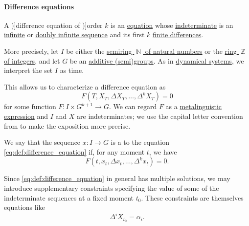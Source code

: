 \paragraph{Difference equations}

\begin{definition}\label{def:difference_equation}\mimprovised
  A \term[ru=разностное уравнение (\cite[307]{Гельфонд1959ИсчислениеКонечныхРазностей})]{difference equation} of \term[ru=порядок (разностного уравнения) (\cite[307]{Гельфонд1959ИсчислениеКонечныхРазностей})]{order} \( k \) is an \hyperref[def:equation]{equation} whose \hyperref[con:indeterminate]{indeterminate} is an \hyperref[def:sequence]{infinite} or \hyperref[def:doubly_infinite_sequence]{doubly infinite sequence} and its first \( k \) \hyperref[def:finite_difference_operator]{finite differences}.

  More precisely, let \( I \) be either the \hyperref[def:natural_numbers]{semiring \( \BbbN \) of natural numbers} or the \hyperref[def:integers]{ring \( \BbbZ \) of integers}, and let \( G \) be an \hyperref[con:additive_semigroup]{additive (semi)groups}. As in \hyperref[def:dynamical_system]{dynamical systems}, we interpret the set \( I \) as time.

  This allows us to characterize a difference equation as
  \begin{equation}\label{eq:def:difference_equation}
    F(T, X_T, \Delta X_T, \ldots, \Delta^k X_T) = 0
  \end{equation}
  for some function \( F: I \times G^{k+1} \to G \). We can regard \( F \) as a \hyperref[con:expression]{metalinguistic expression} and \( I \) and \( X \) are indeterminates; we use the capital letter convention from  to make the exposition more precise.

  \begin{thmenum}
     We say that the sequence \( x: I \to G \) is a  to the equation \eqref{eq:def:difference_equation} if, for any moment \( t \), we have
    \begin{equation*}
      F(t, x_t, \Delta x_t, \ldots, \Delta^k x_t) = 0.
    \end{equation*}

     Since \eqref{eq:def:difference_equation} in general has multiple solutions, we may introduce supplementary constraints specifying the value of some of the indeterminate sequences at a fixed moment \( t_0 \). These constraints are themselves equations like
    \begin{equation*}
      \Delta^i X_{t_0} = \alpha_i.
    \end{equation*}


\end{thmenum}
\end{definition}
